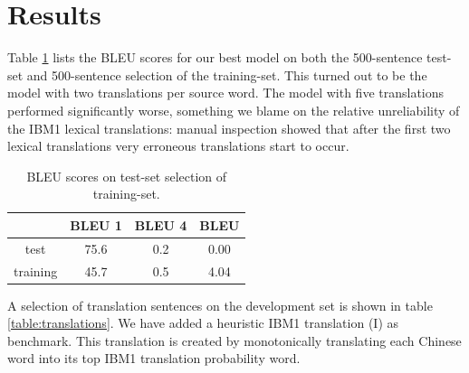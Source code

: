 \documentclass[11pt,a4paper]{article}
\begin{document}
\section{Results}

Table \ref{table:results} lists the BLEU scores for our best model on both the 500-sentence test-set and 500-sentence selection of the training-set. This turned out to be the model with two translations per source word. The model with five translations performed significantly worse, something we blame on the relative unreliability of the IBM1 lexical translations: manual inspection showed that after the first two lexical translations very erroneous translations start to occur. 
\begin{table}
\center
\begin{tabular}{|c|c|c|c|}
    \hline
    & BLEU 1 & BLEU 4 & BLEU \\ 
    \hline
    test & 75.6 & 0.2 & 0.00 \\
    \hline
    training & 45.7 & 0.5 & 4.04 \\
    \hline
\end{tabular}
\caption{BLEU scores on test-set selection of training-set.}
\label{table:results}
\end{table}


A selection of translation sentences on the development set is shown in table \ref{table:translations}. We have added a heuristic IBM1 translation (I) as benchmark. This translation is created by monotonically translating each Chinese word into its top IBM1 translation probability word.
\end{document}
